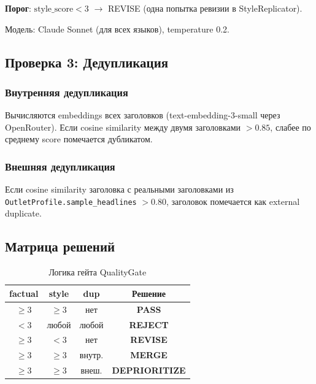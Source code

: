 \textbf{Порог}: $\text{style\_score} < 3$ $\to$ REVISE (одна попытка ревизии в StyleReplicator).

Модель: Claude Sonnet (для всех языков), temperature 0.2.

\subsection{Проверка 3: Дедупликация}

\subsubsection{Внутренняя дедупликация}

Вычисляются embeddings всех заголовков (text-embedding-3-small через OpenRouter). Если cosine similarity между двумя заголовками $> 0.85$, слабее по среднему score помечается дубликатом.

\subsubsection{Внешняя дедупликация}

Если cosine similarity заголовка с реальными заголовками из \verb|OutletProfile.sample_headlines| $> 0.80$, заголовок помечается как external duplicate.

\subsection{Матрица решений}

\begin{table}[h]
  \centering
  \caption{Логика гейта QualityGate}
  \label{tab:gate-logic}
  \begin{tabular}{|c|c|c|c|}
    \hline
    \textbf{factual} & \textbf{style} & \textbf{dup} & \textbf{Решение} \\
    \hline
    $\geq 3$ & $\geq 3$ & нет & \textbf{PASS} \\
    \hline
    $< 3$ & любой & любой & \textbf{REJECT} \\
    \hline
    $\geq 3$ & $< 3$ & нет & \textbf{REVISE} \\
    \hline
    $\geq 3$ & $\geq 3$ & внутр. & \textbf{MERGE} \\
    \hline
    $\geq 3$ & $\geq 3$ & внеш. & \textbf{DEPRIORITIZE} \\
    \hline
  \end{tabular}
\end{table}

